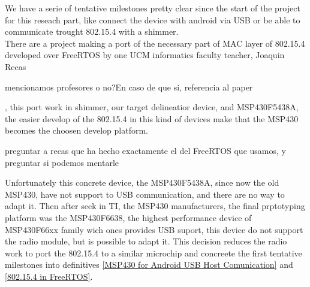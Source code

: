 
	We have a serie of tentative milestones pretty clear since the start of the project for this reseach part, like connect the device with android via USB or be able to communicate trought 802.15.4 with a shimmer.\\

	There are a project making a port of the necessary part of MAC layer of 802.15.4 developed over FreeRTOS by one UCM informatics faculty teacher, Joaquin Recas\begin{todo}mencionamos profesores o no?En caso de que si, referencia al paper\end{todo}, this port work in shimmer, our target delineatior device, and MSP430F5438A, the easier develop of the 802.15.4 in this kind of devices make that the MSP430 becomes the choosen develop platform.\\

	\begin{todo}preguntar a recas que ha hecho exactamente el del FreeRTOS que usamos, y preguntar si podemos mentarle\end{todo}

	Unfortunately this concrete device, the MSP430F5438A, since now the old MSP430, have not support to USB communication, and there are no way to adapt it. Then after seek in TI, the MSP430 manufacturers, the final prptotyping platform was the MSP430F6638, the highest performance device of MSP430F66xx family wich ones provides USB suport, this device do not support the radio module, but is possible to adapt it. This decision reduces the radio work to port the 802.15.4 to a similar microchip and concreete the first tentative milestones into definitives \autoref{MSP430 for Android USB Host Comunication} and \autoref{802.15.4 in FreeRTOS}. \\

